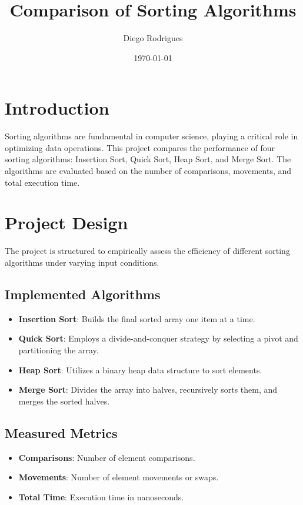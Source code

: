 \documentclass{article}
\begin{document}
\title{Comparison of Sorting Algorithms}
\author{Diego Rodrigues}
\date{\today}
\maketitle

\section{Introduction}

Sorting algorithms are fundamental in computer science, playing a critical role in optimizing data operations. This project compares the performance of four sorting algorithms: Insertion Sort, Quick Sort, Heap Sort, and Merge Sort. The algorithms are evaluated based on the number of comparisons, movements, and total execution time.

\section{Project Design}

The project is structured to empirically assess the efficiency of different sorting algorithms under varying input conditions.

\subsection{Implemented Algorithms}

\begin{itemize}
    \item \textbf{Insertion Sort}: Builds the final sorted array one item at a time.
    \item \textbf{Quick Sort}: Employs a divide-and-conquer strategy by selecting a pivot and partitioning the array.
    \item \textbf{Heap Sort}: Utilizes a binary heap data structure to sort elements.
    \item \textbf{Merge Sort}: Divides the array into halves, recursively sorts them, and merges the sorted halves.
\end{itemize}

\subsection{Measured Metrics}

\begin{itemize}
    \item \textbf{Comparisons}: Number of element comparisons.
    \item \textbf{Movements}: Number of element movements or swaps.
    \item \textbf{Total Time}: Execution time in nanoseconds.
\end{itemize}
\end{document}
